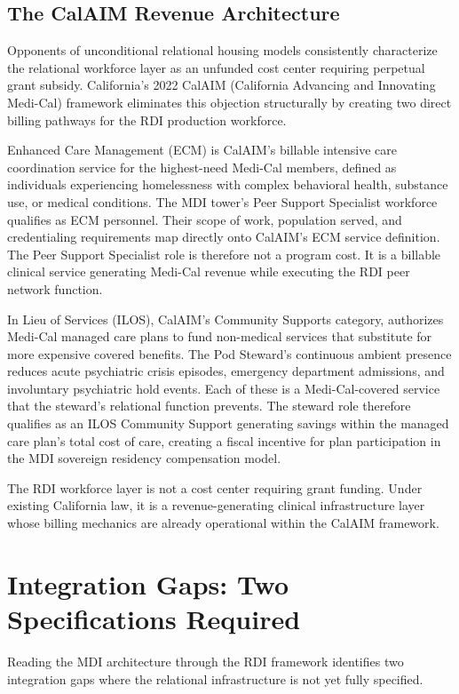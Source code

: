 \documentclass[12pt, letterpaper]{article}
\begin{document}
\subsection{The CalAIM Revenue Architecture}

Opponents of unconditional relational housing models consistently characterize the relational workforce layer as an unfunded cost center requiring perpetual grant subsidy. California's 2022 CalAIM (California Advancing and Innovating Medi-Cal) framework eliminates this objection structurally by creating two direct billing pathways for the RDI production workforce.

Enhanced Care Management (ECM) is CalAIM's billable intensive care coordination service for the highest-need Medi-Cal members, defined as individuals experiencing homelessness with complex behavioral health, substance use, or medical conditions. The MDI tower's Peer Support Specialist workforce qualifies as ECM personnel. Their scope of work, population served, and credentialing requirements map directly onto CalAIM's ECM service definition. The Peer Support Specialist role is therefore not a program cost. It is a billable clinical service generating Medi-Cal revenue while executing the RDI peer network function.

In Lieu of Services (ILOS), CalAIM's Community Supports category, authorizes Medi-Cal managed care plans to fund non-medical services that substitute for more expensive covered benefits. The Pod Steward's continuous ambient presence reduces acute psychiatric crisis episodes, emergency department admissions, and involuntary psychiatric hold events. Each of these is a Medi-Cal-covered service that the steward's relational function prevents. The steward role therefore qualifies as an ILOS Community Support generating savings within the managed care plan's total cost of care, creating a fiscal incentive for plan participation in the MDI sovereign residency compensation model.

The RDI workforce layer is not a cost center requiring grant funding. Under existing California law, it is a revenue-generating clinical infrastructure layer whose billing mechanics are already operational within the CalAIM framework.

\clearpage
\section{Integration Gaps: Two Specifications Required}

Reading the MDI architecture through the RDI framework identifies two integration gaps where the relational infrastructure is not yet fully specified.
\end{document}
